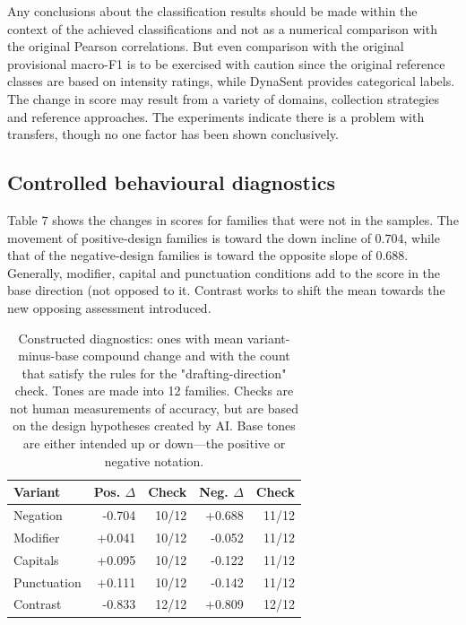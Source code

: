 \documentclass[11pt]{article}
\begin{document}
Any conclusions about the classification results should be made within the context of the achieved classifications and not as a numerical comparison with the original Pearson correlations. But even comparison with the original provisional macro-F1 is to be exercised with caution since the original reference classes are based on intensity ratings, while DynaSent provides categorical labels. The change in score may result from a variety of domains, collection strategies and reference approaches. The experiments indicate there is a problem with transfers, though no one factor has been shown conclusively.


\subsection{Controlled behavioural diagnostics}

Table 7 shows the changes in scores for families that were not in the samples. The movement of positive-design families is toward the down incline of 0.704, while that of the negative-design families is toward the opposite slope of 0.688. Generally, modifier, capital and punctuation conditions add to the score in the base direction (not opposed to it. Contrast works to shift the mean towards the new opposing assessment introduced.


\begin{table}[t]
\centering\small
\setlength{\tabcolsep}{5pt}
\begin{tabular}{@{}lrrrr@{}}
\toprule
Variant & Pos. \ensuremath{\Delta} & Check & Neg. \ensuremath{\Delta} & Check\\
\midrule
Negation & -0.704 & 10/12 & +0.688 & 11/12\\
Modifier & +0.041 & 10/12 & -0.052 & 11/12\\
Capitals & +0.095 & 10/12 & -0.122 & 11/12\\
Punctuation & +0.111 & 10/12 & -0.142 & 11/12\\
Contrast & -0.833 & 12/12 & +0.809 & 12/12\\
\bottomrule
\end{tabular}
\caption{Constructed diagnostics: ones with mean variant-minus-base compound change and with the count that satisfy the rules for the "drafting-direction" check. Tones are made into 12 families. Checks are not human measurements of accuracy, but are based on the design hypotheses created by AI. Base tones are either intended up or down---the positive or negative notation.}
\label{tab:user7}
\end{table}
\end{document}

